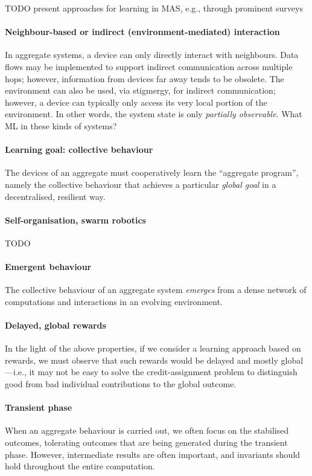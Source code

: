 \documentclass[
twocolumn,
]{ceurart}
\newcommand{\meta}[1]{{\color{blue}#1}}
\begin{document}
\meta{TODO present approaches for learning in MAS, e.g., through prominent surveys}

\paragraph{Neighbour-based or indirect (environment-mediated) interaction}
%
In aggregate systems,
 a device can only directly interact with neighbours.
%
Data flows may be implemented
 to support indirect communication across multiple hops;
 however, information from devices far away tends to be obsolete.
%
The environment can also be used, via stigmergy,
 for indirect communication;
 however, a device can typically only access 
  its very local portion of the environment.
%
In other words, the system state is only \emph{partially observable}.
%
\meta{What ML in these kinds of systems?}

\paragraph{Learning goal: collective behaviour}
%
The devices of an aggregate 
 must cooperatively learn the ``aggregate program'',
 namely the collective behaviour 
 that achieves a particular \emph{global goal}
 in a decentralised, resilient way.
%

\paragraph{Self-organisation, swarm robotics}
%
\meta{TODO}

\paragraph{Emergent behaviour}
%
The collective behaviour of an aggregate system
 \emph{emerges} 
 from a dense network of computations and interactions
 in an evolving environment.
%

\paragraph{Delayed, global rewards}
%
In the light of the above properties,
 if we consider a learning approach based on rewards,
 we must observe that such rewards would be
 delayed and mostly global---i.e.,
 it may not be easy to solve the credit-assignment problem
 to distinguish good from bad individual contributions
 to the global outcome.

\paragraph{Transient phase}
%
When an aggregate behaviour is carried out,
 we often focus on the stabilised outcomes,
 tolerating outcomes that are being generated
 during the transient phase.
%
However, intermediate results are often important,
 and invariants should hold throughout the entire computation.
\end{document}

